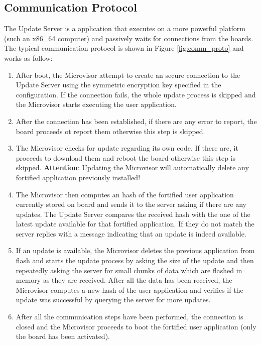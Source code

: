 \documentclass{article}
\begin{document}
\subsection{Communication Protocol}
The Update Server is a application that executes on a more powerful platform (such an x86\_64 computer) and passively waits for connections from the boards.
The typical communication protocol is shown in Figure \ref{fig:comm_proto} and works as follow:
\begin{enumerate}
	\item After boot, the Microvisor attempt to create an secure connection to the Update Server using the symmetric encryption key specified in the configuration. If the connection fails, the whole update process is skipped and the Microvisor starts executing the user application.
	\item After the connection has been established, if there are any error to report, the board proceeds ot report them otherwise this step is skipped.
	\item The Microvisor checks for update regarding its own code. If there are, it proceeds to download them and reboot the board otherwise this step is skipped. \textbf{Attention}: Updating the Microvisor will automatically delete any fortified application previously installed!
	\item The Microvisor then computes an hash of the fortified user application currently stored on board and sends it to the server asking if there are any updates. The Update Server compares the received hash with the one of the latest update available for that fortified application. If they do not match the server replies with a message indicating that an update is indeed available.
	\item If an update is available, the Microvisor deletes the previous application from flash and starts the update process by asking the size of the update and then repeatedly asking the server for small chunks of data which are flashed in memory as they are received. After all the data has been received, the Microvisor computes a new hash of the user application and verifies if the update was successful by querying the server for more updates.
	\item After all the communication steps have been performed, the connection is closed and the Microvisor proceeds to boot the fortified user application (only the board has been activated).
\end{enumerate}
\end{document}
